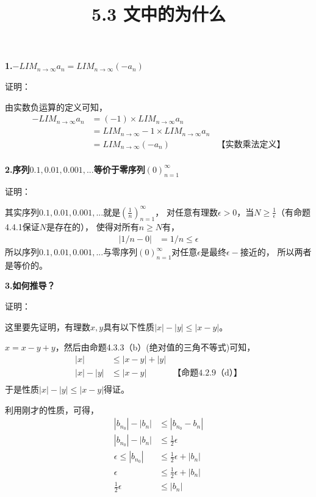 \documentclass{article}
\theoremstyle{mystyle}
\begin{document}
\title{5.3 文中的为什么}
\maketitle

\textbf{1.$-LIM_{n \rightarrow \infty}a_n = LIM_{n \rightarrow \infty}(-a_n)$}

证明：

由实数负运算的定义可知，
\begin{align*}
  -LIM_{n \rightarrow \infty}a_n & = (-1) \times LIM_{n \rightarrow \infty}a_n                                           \\
                                 & = LIM_{n \rightarrow \infty}-1 \times LIM_{n \rightarrow \infty}a_n                   \\
                                 & = LIM_{n \rightarrow \infty}(-a_n)                                  & \text{【实数乘法定义】} \\
\end{align*}

\textbf{2.序列$0.1,0.01,0.001,...$等价于零序列$(0)_{n=1}^\infty$}

证明：

其实序列$0.1,0.01,0.001,...$就是$(\frac{1}{n})_{n=1}^\infty$，
对任意有理数$\epsilon > 0$，当$N \geq \frac{1}{\epsilon}$（有命题4.4.1保证$N$是存在的），
使得对所有$n \geq N$有，
\begin{align*}
  |1/n - 0| & = 1/n \leq \epsilon
\end{align*}
所以序列$0.1,0.01,0.001,...$与零序列$(0)_{n=1}^\infty$对任意$\epsilon$是最终$\epsilon -$接近的，
所以两者是等价的。


\textbf{3.如何推导？}

证明：

这里要先证明，有理数$x,y$具有以下性质$|x|-|y| \leq |x-y|$。

$x=x-y+y$，然后由命题4.3.3（b）(绝对值的三角不等式)可知，
\begin{align*}
  |x|       & \leq |x-y| + |y|                       \\
  |x| - |y| & \leq |x-y|       & \text{【命题4.2.9（d）】} \\
\end{align*}
于是性质$|x|-|y| \leq |x-y|$得证。

利用刚才的性质，可得，
\begin{align*}
  |b_{n_0}| - |b_{n}|     & \leq |b_{n_0} - b_{n}|             \\
  |b_{n_0}| - |b_{n}|     & \leq \frac{1}{2}\epsilon           \\
  \epsilon \leq |b_{n_0}| & \leq \frac{1}{2}\epsilon + |b_{n}| \\
  \epsilon                & \leq \frac{1}{2}\epsilon + |b_{n}| \\
  \frac{1}{2}\epsilon     & \leq  |b_{n}|
\end{align*}
\end{document}
